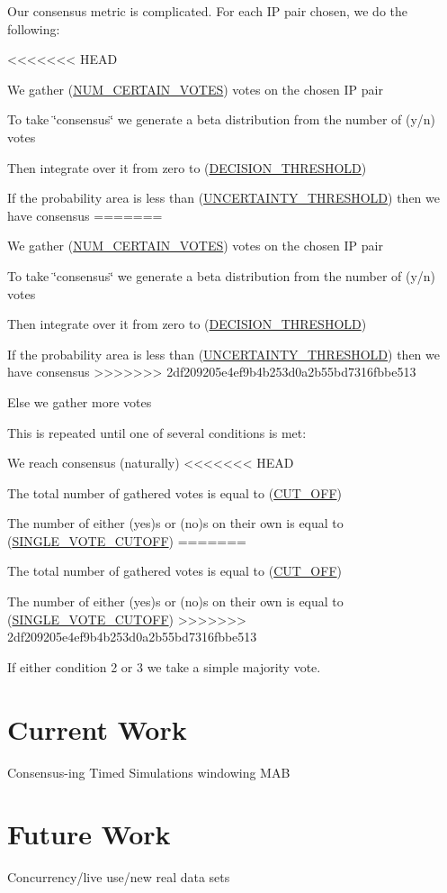 Our consensus metric is complicated. For each IP pair chosen, we do the following\+:
\begin{DoxyItemize}
<<<<<<< HEAD
\item We gather (\mbox{\hyperlink{namespacedynamicfilterapp_1_1toggles_a157bc167f366f75c9ba8d3e36e8d8540}{N\+U\+M\+\_\+\+C\+E\+R\+T\+A\+I\+N\+\_\+\+V\+O\+T\+ES}}) votes on the chosen IP pair
\item To take \char`\"{}consensus\char`\"{} we generate a beta distribution from the number of (y/n) votes
\item Then integrate over it from zero to (\mbox{\hyperlink{namespacedynamicfilterapp_1_1toggles_ac4442b6c569574253ef445d09952d3f0}{D\+E\+C\+I\+S\+I\+O\+N\+\_\+\+T\+H\+R\+E\+S\+H\+O\+LD}})
\item If the probability area is less than (\mbox{\hyperlink{namespacedynamicfilterapp_1_1toggles_aaefdc27b85545eb4a910f5c65f7d8bbb}{U\+N\+C\+E\+R\+T\+A\+I\+N\+T\+Y\+\_\+\+T\+H\+R\+E\+S\+H\+O\+LD}}) then we have consensus
=======
\item We gather (\mbox{\hyperlink{}{N\+U\+M\+\_\+\+C\+E\+R\+T\+A\+I\+N\+\_\+\+V\+O\+T\+ES}}) votes on the chosen IP pair
\item To take \char`\"{}consensus\char`\"{} we generate a beta distribution from the number of (y/n) votes
\item Then integrate over it from zero to (\mbox{\hyperlink{}{D\+E\+C\+I\+S\+I\+O\+N\+\_\+\+T\+H\+R\+E\+S\+H\+O\+LD}})
\item If the probability area is less than (\mbox{\hyperlink{}{U\+N\+C\+E\+R\+T\+A\+I\+N\+T\+Y\+\_\+\+T\+H\+R\+E\+S\+H\+O\+LD}}) then we have consensus
>>>>>>> 2df209205e4ef9b4b253d0a2b55bd7316fbbe513
\item Else we gather more votes
\end{DoxyItemize}

This is repeated until one of several conditions is met\+:
\begin{DoxyEnumerate}
\item We reach consensus (naturally)
<<<<<<< HEAD
\item The total number of gathered votes is equal to (\mbox{\hyperlink{namespacedynamicfilterapp_1_1toggles_a914791c176a78c026dc76a18bcd88d73}{C\+U\+T\+\_\+\+O\+FF}})
\item The number of either (yes)s or (no)s on their own is equal to (\mbox{\hyperlink{namespacedynamicfilterapp_1_1toggles_afa8e106b735033b706b1412e12f6783b}{S\+I\+N\+G\+L\+E\+\_\+\+V\+O\+T\+E\+\_\+\+C\+U\+T\+O\+FF}})
=======
\item The total number of gathered votes is equal to (\mbox{\hyperlink{}{C\+U\+T\+\_\+\+O\+FF}})
\item The number of either (yes)s or (no)s on their own is equal to (\mbox{\hyperlink{}{S\+I\+N\+G\+L\+E\+\_\+\+V\+O\+T\+E\+\_\+\+C\+U\+T\+O\+FF}})
>>>>>>> 2df209205e4ef9b4b253d0a2b55bd7316fbbe513
\end{DoxyEnumerate}

If either condition 2 or 3 we take a simple majority vote.\hypertarget{index_current}{}\section{Current Work}\label{index_current}
Consensus-\/ing Timed Simulations windowing M\+AB\hypertarget{index_future}{}\section{Future Work}\label{index_future}
Concurrency/live use/new real data sets 